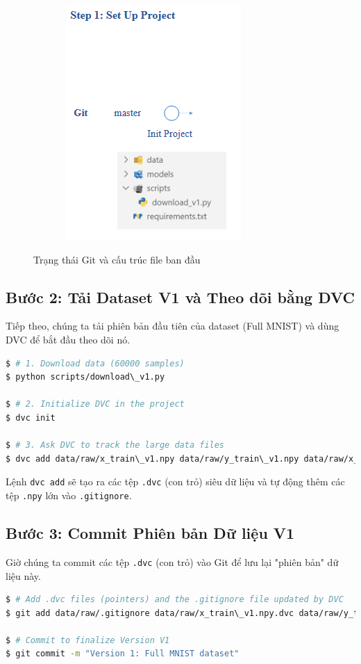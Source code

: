 \documentclass[11pt]{article}
\begin{document}
\begin{figure}[H]
    \centering
    \includegraphics[width=0.4\linewidth]{images/p3.png}
    \caption{Trạng thái Git và cấu trúc file ban đầu}
\end{figure}

\subsection{Bước 2: Tải Dataset V1 và Theo dõi bằng DVC}
Tiếp theo, chúng ta tải phiên bản đầu tiên của dataset (Full MNIST) và dùng DVC để bắt đầu theo dõi nó.

\begin{lstlisting}[language=bash]
$ # 1. Download data (60000 samples)
$ python scripts/download\_v1.py

$ # 2. Initialize DVC in the project
$ dvc init

$ # 3. Ask DVC to track the large data files
$ dvc add data/raw/x_train\_v1.npy data/raw/y_train\_v1.npy data/raw/x_test.npy data/raw/y_test.npy
\end{lstlisting}
Lệnh \texttt{dvc add} sẽ tạo ra các tệp \texttt{.dvc} (con trỏ) siêu dữ liệu và tự động thêm các tệp \texttt{.npy} lớn vào \texttt{.gitignore}.

\subsection{Bước 3: Commit Phiên bản Dữ liệu V1}
Giờ chúng ta commit các tệp \texttt{.dvc} (con trỏ) vào Git để lưu lại "phiên bản" dữ liệu này.

\begin{lstlisting}[language=bash]
$ # Add .dvc files (pointers) and the .gitignore file updated by DVC
$ git add data/raw/.gitignore data/raw/x_train\_v1.npy.dvc data/raw/y_train\_v1.npy.dvc data/raw/x_test.npy.dvc data/raw/y_test.npy.dvc

$ # Commit to finalize Version V1
$ git commit -m "Version 1: Full MNIST dataset"
\end{lstlisting}
\end{document}
